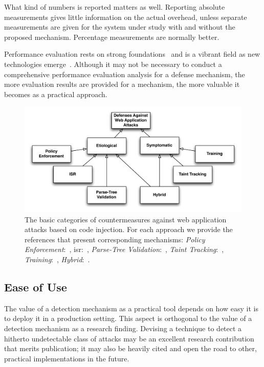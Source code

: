 \documentclass[conference]{IEEEtran}
\begin{document}
What kind of numbers is reported matters as well. Reporting absolute
measurements gives little information on the actual overhead, unless
separate measurements are given for the system under study with and
without the proposed mechanism. Percentage measurements are normally
better. 

Performance evaluation rests on strong foundations~\cite{jain1991} and
is a vibrant field as new technologies emerge~\cite{gregg2014}.
Although it may not be necessary to conduct a comprehensive
performance evaluation analysis for a defense mechanism, the more
evaluation results are provided for a mechanism, the more valuable
it becomes as a practical approach.

\begin{figure}[t]
\begin{center}
\leavevmode
\includegraphics[scale=0.65]{defenses.pdf}
\end{center}
\caption{\label{fig:defenses}The basic categories of countermeasures
against web application attacks based on code
injection. For each approach we provide the references
that present corresponding mechanisms:
{\it Policy Enforcement}:~\cite{NSS06,JKK06a,KKVJ06,KJKV09,TNH07,RDWDE07,YCIS07,OWVS08,PSC09,ML10,DDHPJ10,PS11,VDDPJ11,BV08,SSM10},
{\sc isr}:~\cite{BK04,JB07,GC09,APKLM10},
{\it Parse-Tree Validation}:~\cite{BWS05,SW06},
{\it Taint Tracking}:~\cite{HCF05,PB05,XBS06,NLC07,VFJKKV07,PMP11,SLMS14},
{\it Training}:~\cite{LLW02,HO05,HO06,HO05b,VMV05,JEP08,WPLKK09,MS09,MKS09,MKLS11},
{\it Hybrid}:~\cite{BV08,LV09,SMS13}.}
\end{figure}

\subsection{Ease of Use}
\label{sec:deployment}

The value of a detection mechanism as a practical tool depends on how
easy it is to deploy it in a production setting. This aspect is
orthogonal to the
value of a detection mechanism as a research finding. Devising a
technique to detect a hitherto undetectable class of attacks may be an
excellent research contribution that merits publication; it may also
be heavily cited and open the road to other, practical
implementations in the future. 
\end{document}

